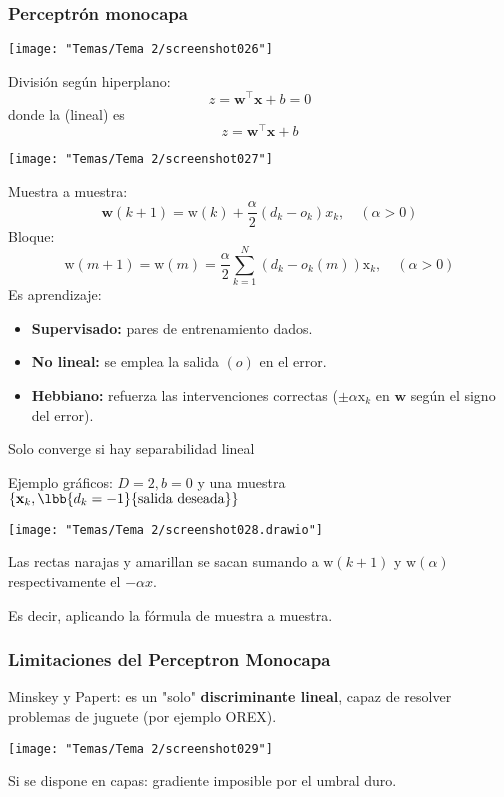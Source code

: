 \subsubsection{Perceptrón monocapa}
\begin{center}
	\texttt{[image: "Temas/Tema 2/screenshot026"]}
\end{center}
\begin{minipage}{0.5\textwidth}
	División según hiperplano: \[ z=\mathbf{w^\intercal x}+b=0 \]donde la  (lineal) es \[ z=\mathbf{w^\intercal x}+b \]
\end{minipage}\qquad\begin{minipage}{0.5\textwidth}
\begin{center}
	\texttt{[image: "Temas/Tema 2/screenshot027"]}
\end{center}
\end{minipage}
Muestra a muestra: \[ \mathbf{w}(k+1)=\mathrm{w}(k)+\dfrac{\alpha}{2}(d_k-o_k)x_k,\quad(\alpha>0) \]
Bloque: \[ \mathrm{w}(m+1)=\mathrm{w}(m)=\dfrac{\alpha}{2}\sum_{k=1}^{N}(d_k-o_k(m))\mathrm{x}_k,\quad(\alpha>0) \]
Es aprendizaje:
\begin{itemize}
	\item \textbf{Supervisado:} pares de entrenamiento dados.
	\item \textbf{No lineal:} se emplea la salida $(o)$ en el error.
	\item \textbf{Hebbiano:} refuerza las intervenciones correctas ($\pm\alpha\mathrm{x}_k$ en $\mathbf{w}$ según el signo del error).
\end{itemize}
Solo converge si hay separabilidad lineal

Ejemplo gráficos: $D=2,b=0$ y una muestra $\{\mathbf{x}_k,\lbb{d_k=-1}{\text{salida deseada}}\}$
\begin{center}
	\texttt{[image: "Temas/Tema 2/screenshot028.drawio"]}
\end{center}

Las rectas narajas y amarillan se sacan sumando a $\mathrm{w}(k+1)$ y $\mathrm{w}(\alpha)$ respectivamente el $-\alpha x$.

Es decir, aplicando la fórmula de muestra a muestra.
\subsubsection{Limitaciones del Perceptron Monocapa}
Minskey y Papert: es un "solo" \textbf{discriminante lineal}, capaz de resolver problemas de juguete (por ejemplo OREX).
\begin{center}
	\texttt{[image: "Temas/Tema 2/screenshot029"]}
\end{center}
Si se dispone en capas: gradiente imposible por el umbral duro.


